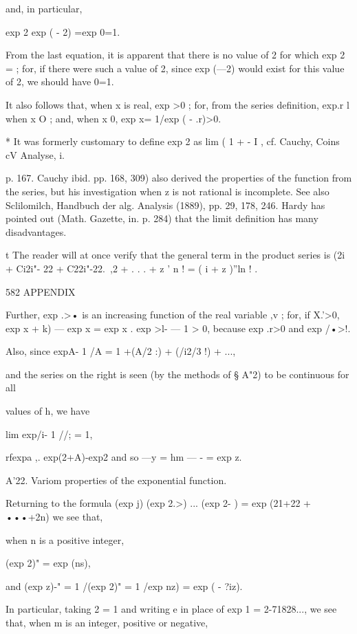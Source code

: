 and, in particular, 

 exp 2   exp ( - 2)  =exp 0=1. 

From the last equation, it is apparent that there is no value of 2 for which exp 2 = ; 
for, if there were such a value of 2, since exp (—2) would exist for this value of 2, we 
should have 0=1. 

It also follows that, when x is real, exp >0 ; for, from the series definition, exp.r l 
when x O ; and, when x   0, exp x= 1/exp ( - .r)>0. 



* It was formerly customary to define exp 2 as lim ( 1 + - I , cf. Cauchy, Coins cV Analyse, i. 

p. 167. Cauchy  ibid. pp. 168, 309) also derived the properties of the function from the series, 
but his investigation when z is not rational is incomplete. See also Sclilomilch, Handbuch der 
alg. Analysis (1889), pp. 29, 178, 246. Hardy has pointed out (Math. Gazette, in. p. 284) that 
the limit definition has many disadvantages. 

t The reader will at once verify that the general term in the product series is 
(2i  +   Ci2i"- 22 +   C22i"-22.\ ,2 + . . . + z ' n ! = ( i + z )''ln ! . 



582 APPENDIX 

Further, exp .>• is an increasing function of the real variable ,v ; for, if X.'>0, 
exp  x + k) — exp x = exp x .  exp >l- — 1   > 0, 
because exp .r>0 and exp /•>!. 

Also, since  expA- 1 /A = 1 +(A/2 :) + (/i2/3 !) + ..., 

and the series on the right is seen (by the methods of § A"2) to be continuous for all 

values of h, we have 

lim  exp/i- 1 //; = 1, 

rfexpa ,. exp(2+A)-exp2 
and so —y = hm — -   = exp z. 

A'22. Variom properties of the exponential function. 

Returning to the formula (exp  j) (exp 2.>) ... (exp 2- ) = exp (21+22 + •••+2n)  we see that, 

when n is a positive integer, 

(exp 2)" = exp (ns), 

and (exp z)-" = 1 /(exp 2)" = 1 /exp  nz) = exp ( - ?iz). 

In particular, taking 2 = 1 and writing e in place of exp 1 = 2-71828..., we see that, 
when m is an integer, positive or negative, 

